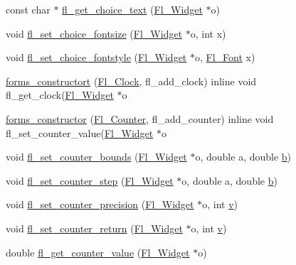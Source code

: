 \begin{DoxyCompactItemize}
const char $\ast$ \hyperlink{forms_8_h_a185b7229b762cf5764556b8ff12bd585}{fl\+\_\+get\+\_\+choice\+\_\+text} (\hyperlink{class_fl___widget}{Fl\+\_\+\+Widget} $\ast$o)
\item 
void \hyperlink{forms_8_h_a13610133134a15947e1770005cab4abe}{fl\+\_\+set\+\_\+choice\+\_\+fontsize} (\hyperlink{class_fl___widget}{Fl\+\_\+\+Widget} $\ast$o, int x)
\item 
void \hyperlink{forms_8_h_a6ce0681b3c2a1d1cb2165fcf109e33bc}{fl\+\_\+set\+\_\+choice\+\_\+fontstyle} (\hyperlink{class_fl___widget}{Fl\+\_\+\+Widget} $\ast$o, \hyperlink{_enumerations_8_h_a2ac46d9f082834b969fffe490a03a709}{Fl\+\_\+\+Font} x)
\item 
\hyperlink{forms_8_h_a13434f80af3723dcccebcbdfea3f3dc0}{forms\+\_\+constructort} (\hyperlink{class_fl___clock}{Fl\+\_\+\+Clock}, fl\+\_\+add\+\_\+clock) inline void fl\+\_\+get\+\_\+clock(\hyperlink{class_fl___widget}{Fl\+\_\+\+Widget} $\ast$o
\item 
\hyperlink{forms_8_h_ab85a9db2f395c20da75e404d86bbe90f}{forms\+\_\+constructor} (\hyperlink{class_fl___counter}{Fl\+\_\+\+Counter}, fl\+\_\+add\+\_\+counter) inline void fl\+\_\+set\+\_\+counter\+\_\+value(\hyperlink{class_fl___widget}{Fl\+\_\+\+Widget} $\ast$o
\item 
void \hyperlink{forms_8_h_a4d3635b34f7de94e7d4353d692482774}{fl\+\_\+set\+\_\+counter\+\_\+bounds} (\hyperlink{class_fl___widget}{Fl\+\_\+\+Widget} $\ast$o, double a, double \hyperlink{forms_8_h_a0ba06a290a384fa06b1b90745827dae2}{b})
\item 
void \hyperlink{forms_8_h_a37d82033d6c80ad7bdfe1b7891545984}{fl\+\_\+set\+\_\+counter\+\_\+step} (\hyperlink{class_fl___widget}{Fl\+\_\+\+Widget} $\ast$o, double a, double \hyperlink{forms_8_h_a0ba06a290a384fa06b1b90745827dae2}{b})
\item 
void \hyperlink{forms_8_h_ab411724421b16302de156268b8184574}{fl\+\_\+set\+\_\+counter\+\_\+precision} (\hyperlink{class_fl___widget}{Fl\+\_\+\+Widget} $\ast$o, int \hyperlink{forms_8_h_a3b90d5a73541ab9402511d87bed076ef}{v})
\item 
void \hyperlink{forms_8_h_a9f7869c8b6ac047ef2342a20ca064f89}{fl\+\_\+set\+\_\+counter\+\_\+return} (\hyperlink{class_fl___widget}{Fl\+\_\+\+Widget} $\ast$o, int \hyperlink{forms_8_h_a3b90d5a73541ab9402511d87bed076ef}{v})
\item 
double \hyperlink{forms_8_h_afa5bd7d666135b09fd17e0b0556f8df1}{fl\+\_\+get\+\_\+counter\+\_\+value} (\hyperlink{class_fl___widget}{Fl\+\_\+\+Widget} $\ast$o)
\item 

\end{DoxyCompactItemize}
